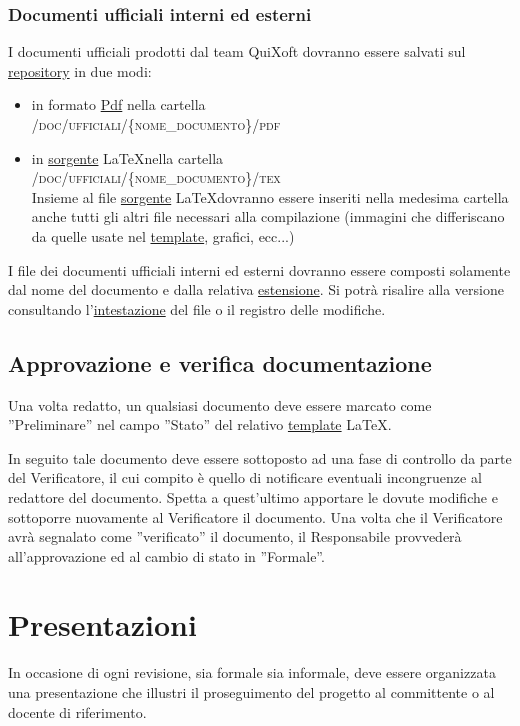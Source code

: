 \documentclass[11pt,a4paper]{article}
\begin{document}
\subsubsection{Documenti ufficiali interni ed esterni}
I documenti ufficiali prodotti dal team QuiXoft dovranno essere salvati sul \underline{repository} in due modi:
\begin{itemize}
	\item in formato \underline{Pdf} nella cartella 
\\ \textsc{/doc/ufficiali/\{nome\_documento\}/pdf}
	\item in \underline{sorgente} \LaTeX \space nella cartella 
\\ \textsc{/doc/ufficiali/\{nome\_documento\}/tex}
\\ Insieme al file \underline{sorgente} \LaTeX \space dovranno essere inseriti nella medesima cartella anche tutti gli altri file necessari alla compilazione (immagini che differiscano da quelle usate nel \underline{template}, grafici, ecc...)
\end{itemize}
I file dei documenti ufficiali interni ed esterni dovranno essere composti solamente dal nome del documento e dalla relativa \underline{estensione}. Si potrà risalire alla versione consultando l'\underline{intestazione} del file o il registro delle modifiche.
\subsection{Approvazione e verifica documentazione}
Una volta redatto, un qualsiasi documento deve essere marcato come ''Preliminare'' nel campo ''Stato'' del relativo \underline{template} \LaTeX.

In seguito tale documento deve essere sottoposto ad una fase di controllo da parte del Verificatore, il cui compito è quello di notificare eventuali incongruenze al redattore del documento.
Spetta a quest'ultimo apportare le dovute modifiche e sottoporre nuovamente al Verificatore il documento.
Una volta che il Verificatore avrà segnalato come ''verificato'' il documento, il Responsabile provvederà all'approvazione ed al cambio di stato in ''Formale''.
\section{Presentazioni}
In occasione di ogni revisione, sia formale sia informale, deve essere organizzata una presentazione che illustri il proseguimento del progetto al committente o al docente di riferimento.
\end{document}
